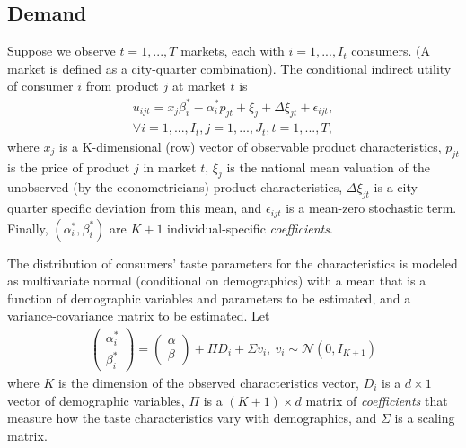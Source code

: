 \documentclass[11pt]{elegantbook}
\begin{document}
\subsection{Demand}
Suppose we observe $t=1,...,T$ markets, each with $i=1,...,I_t$ consumers. (A market is defined as a city-quarter combination). The conditional indirect utility of consumer $i$ from product $j$ at market $t$ is
\begin{equation}
    \begin{aligned}
        u_{ijt}=x_j\beta_i^*-\alpha_i^*p_{jt}+\xi_{j}+\Delta\xi_{jt}+\epsilon_{ijt},\\ \forall i=1,...,I_t, j=1,...,J_t, t=1,...,T,
    \end{aligned}
    \label{Nevo_2021_(2)}
\end{equation}
where $x_j$ is a K-dimensional (row) vector of observable product characteristics,
$p_{jt}$ is the price of product $j$ in market $t$, $\xi_j$ is the national mean valuation of the unobserved (by the econometricians) product characteristics, $\Delta\xi_{jt}$ is a city-quarter specific deviation from this mean, and $\epsilon_{ijt}$ is a mean-zero stochastic term. Finally, $(\alpha_i^*,\beta_i^*)$ are $K + 1$ individual-specific \textit{coefficients}.

The distribution of consumers' taste parameters for the characteristics is modeled as multivariate normal (conditional on demographics) with a mean that is a function of demographic variables and parameters to be estimated, and a variance-covariance matrix to be estimated. Let
\begin{equation}
    \begin{aligned}
        \begin{pmatrix}
            \alpha_i^*\\
            \beta_i^*
        \end{pmatrix}
        =
        \begin{pmatrix}
            \alpha\\
            \beta
        \end{pmatrix}
        +\Pi D_i + \Sigma v_i,\ v_i\sim \mathcal{N}(0,I_{K+1})
    \end{aligned}
    \label{Nevo_2021_(3)}
\end{equation}
where $K$ is the dimension of the observed characteristics vector, $D_i$ is a $d \times 1$ vector of demographic variables, $\Pi$ is a $(K+1)\times d$ matrix of \textit{coefficients} that measure how the taste characteristics vary with demographics, and $\Sigma$ is a scaling matrix.
\end{document}
